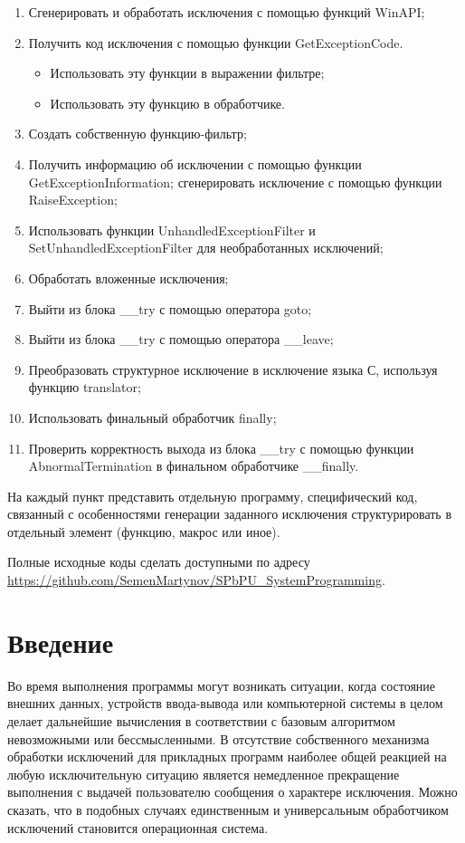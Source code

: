 \documentclass[a4paper, 12pt]{report}		%
\begin{document}
\begin{enumerate}
	\item Сгенерировать и обработать исключения с помощью функций WinAPI;
	\item Получить код исключения с помощью функции GetExceptionCode.
		\begin{itemize}
		\item Использовать эту функции в выражении фильтре;
		\item Использовать эту функцию в обработчике.
		\end{itemize}
	\item Создать собственную функцию-фильтр;
	\item Получить информацию об исключении с помощью функции GetExceptionInformation; сгенерировать исключение с помощью функции RaiseException;
	\item Использовать функции UnhandledExceptionFilter и SetUnhandledExceptionFilter для необработанных исключений;
	\item Обработать вложенные исключения;
	\item Выйти из блока \_\_try с помощью оператора goto;
	\item Выйти из блока \_\_try с помощью оператора \_\_leave;
	\item Преобразовать структурное исключение в исключение языка С, используя функцию translator;
	\item Использовать финальный обработчик finally;
	\item Проверить корректность выхода из блока \_\_try с помощью функции AbnormalTermination в финальном обработчике \_\_finally.
\end{enumerate}

На каждый пункт представить отдельную программу, специфический код, связанный с особенностями генерации заданного исключения структурировать в отдельный элемент (функцию, макрос или иное).

Полные исходные коды сделать доступными по адресу \url{https://github.com/SemenMartynov/SPbPU_SystemProgramming}.


\chapter*{Введение}

Во время выполнения программы могут возникать ситуации, когда состояние внешних данных, устройств ввода-вывода или компьютерной системы в целом делает дальнейшие вычисления в соответствии с базовым алгоритмом невозможными или бессмысленными. В отсутствие собственного механизма обработки исключений для прикладных программ наиболее общей реакцией на любую исключительную ситуацию является немедленное прекращение выполнения с выдачей пользователю сообщения о характере исключения. Можно сказать, что в подобных случаях единственным и универсальным обработчиком исключений становится операционная система.
\end{document}
